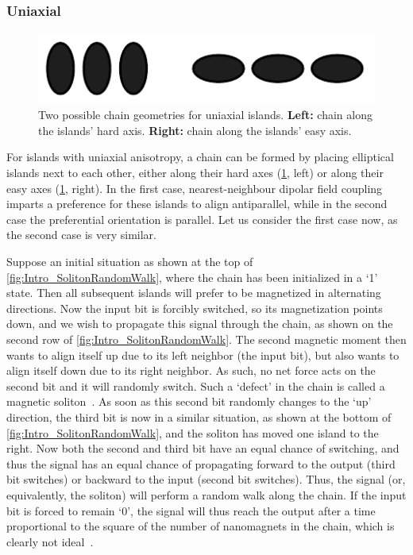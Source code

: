 \documentclass[11pt,a4paper,english]{article}
\begin{document}
\subsubsection{Uniaxial}
\begin{figure}[t!]
    \centering
    \includegraphics[width=0.6\columnwidth]{Figures/Introduction/Uniaxial_chains.pdf}
    \caption{Two possible chain geometries for uniaxial islands. \textbf{Left:} chain along the islands' hard axis. \textbf{Right:} chain along the islands' easy axis.}
    \label{fig:Intro_IslandEllipticChainGeometries}
\end{figure}
For islands with uniaxial anisotropy, a chain can be formed by placing elliptical islands next to each other, either along their hard axes (\cref{fig:Intro_IslandEllipticChainGeometries}, left) or along their easy axes (\cref{fig:Intro_IslandEllipticChainGeometries}, right). In the first case, nearest-neighbour dipolar field coupling imparts a preference for these islands to align antiparallel, while in the second case the preferential orientation is parallel. Let us consider the first case now, as the second case is very similar. \par
Suppose an initial situation as shown at the top of \cref{fig:Intro_SolitonRandomWalk}, where the chain has been initialized in a `1' state. Then all subsequent islands will prefer to be magnetized in alternating directions. Now the input bit is forcibly switched, so its magnetization points down, and we wish to propagate this signal through the chain, as shown on the second row of \cref{fig:Intro_SolitonRandomWalk}. The second magnetic moment then wants to align itself up due to its left neighbor (the input bit), but also wants to align itself down due to its right neighbor. As such, no net force acts on the second bit and it will randomly switch. Such a `defect' in the chain is called a magnetic soliton~\cite{MQCA_RoomTemp}. As soon as this second bit randomly changes to the `up' direction, the third bit is now in a similar situation, as shown at the bottom of \cref{fig:Intro_SolitonRandomWalk}, and the soliton has moved one island to the right. Now both the second and third bit have an equal chance of switching, and thus the signal has an equal chance of propagating forward to the output (third bit switches) or backward to the input (second bit switches). Thus, the signal (or, equivalently, the soliton) will perform a random walk along the chain. If the input bit is forced to remain `0', the signal will thus reach the output after a time proportional to the square of the number of nanomagnets in the chain, which is clearly not ideal~\cite{Wolfram_RandomWalk}. \par
\end{document}
